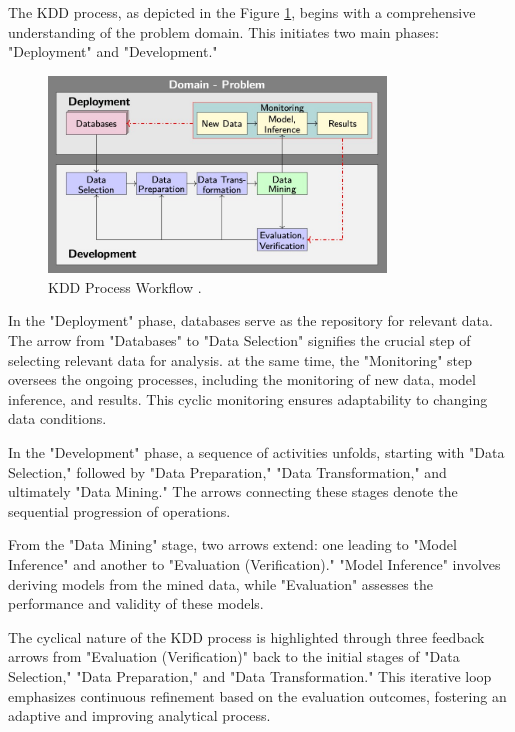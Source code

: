 The KDD process, as depicted in the Figure \ref{fig:KDDProcess}, begins with a comprehensive understanding of the problem domain. This initiates two main phases: "Deployment" and "Development."

\begin{figure}[h!]
	\centering
	\includegraphics[width=0.8\textwidth]{Images/KDDProcess/KDDProcess}
	\caption{KDD Process Workflow \cite{Wings:2023}.} \label{fig:KDDProcess}
\end{figure}

In the "Deployment" phase, databases serve as the repository for relevant data. The arrow from "Databases" to "Data Selection" signifies the crucial step of selecting relevant data for analysis. 
at the same time, the "Monitoring" step oversees the ongoing processes, including the monitoring of new data, model inference, and results. This cyclic monitoring ensures adaptability to changing data conditions.

In the "Development" phase, a sequence of activities unfolds, starting with "Data Selection," followed by "Data Preparation," "Data Transformation," and ultimately "Data Mining." The arrows connecting these stages denote the sequential progression of operations.

From the "Data Mining" stage, two arrows extend: one leading to "Model Inference" and another to "Evaluation (Verification)." "Model Inference" involves deriving models from the mined data, while "Evaluation" assesses the performance and validity of these models.

The cyclical nature of the KDD process is highlighted through three feedback arrows from "Evaluation (Verification)" back to the initial stages of "Data Selection," "Data Preparation," and "Data Transformation." This iterative loop emphasizes continuous refinement based on the evaluation outcomes, fostering an adaptive and improving analytical process.

